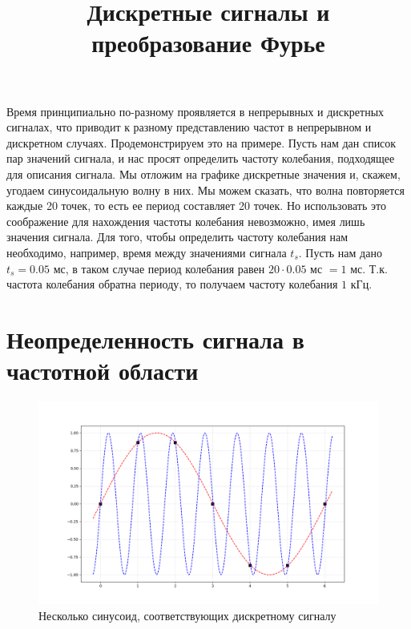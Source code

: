 \documentclass[12pt]{article}
\title{Дискретные сигналы и преобразование Фурье}
\date{}
\begin{document}
\maketitle

Время принципиально по-разному проявляется в непрерывных и дискретных сигналах, что приводит к разному представлению частот в непрерывном и дискретном случаях. Продемонстрируем это на примере. Пусть нам дан список пар значений сигнала, и нас просят определить частоту колебания, подходящее для описания сигнала. Мы отложим на графике дискретные значения и, скажем, угодаем синусоидальную волну в них. Мы можем сказать, что волна повторяется каждые 20 точек, то есть ее период составляет 20 точек. Но использовать это соображение для нахождения частоты колебания невозможно, имея лишь значения сигнала. Для того, чтобы определить частоту колебания нам необходимо, например, время между значениями сигнала $t_s$. Пусть нам дано $t_s = 0.05$ мс, в таком случае период колебания равен $20 \cdot 0.05$ мс $= 1$ мс. Т.к. частота колебания обратна периоду, то получаем частоту колебания $1$ кГц. 

\section{Неопределенность сигнала в частотной области}

\begin{figure}[!ht]
	\centering
	\includegraphics[width = 0.85\linewidth]{../pictures/aliasing.png}
	\caption{Несколько синусоид, соответствующих дискретному сигналу}
\end{figure}
\end{document}
